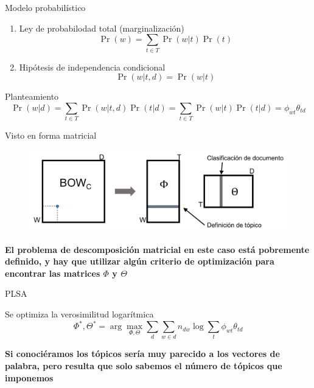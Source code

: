 \documentclass[presentation, t]{beamer}
\begin{document}

\begin{frame}{Modelo probabilístico}
\begin{enumerate}
\item Ley de probabilodad total (marginalización)
\[\Pr(w) = \sum_{t \in T} \Pr(w|t)\Pr(t)\]

\item Hipótesis de independencia condicional
\[\Pr(w|t, d) = \Pr(w|t)\]
\end{enumerate}

\begin{block}{Planteamiento}
\[\Pr(w|d) = \sum_{t \in T} \Pr(w|t, d) \Pr(t|d) = \sum_{t \in T} \Pr(w|t)\Pr(t|d) = \phi_{wt}\theta_{td}\]
\end{block}
\end{frame}
\begin{frame}[label={sec:orgae94f4b}]{Visto en forma matricial}
\begin{figure}[htbp]
\centering
\includegraphics[width=.9\textwidth]{./imagenes/plsa.png}
\end{figure}

\begin{center}
\bf El problema de descomposición matricial en este caso está
pobremente definido, y hay que utilizar algún criterio de optimización
para encontrar las matrices \(\Phi\) y \(\Theta\)
\end{center}
\end{frame}


\begin{frame}{PLSA}
\begin{block}{Se optimiza la verosimilitud logarítmica}
\[\Phi^*, \Theta^* = \arg \max_{\Phi, \Theta} \sum_{d} \sum_{w \in
   d} n_{dw} \log \sum_{t}\phi_{wt}\theta_{td}\] \vfill
\end{block}


\begin{center}
\bf Si conociéramos los tópicos sería muy parecido a los vectores de
palabra, pero resulta que solo sabemos el número de tópicos que
imponemos \vfill
\end{center}
\end{frame}
\end{document}
